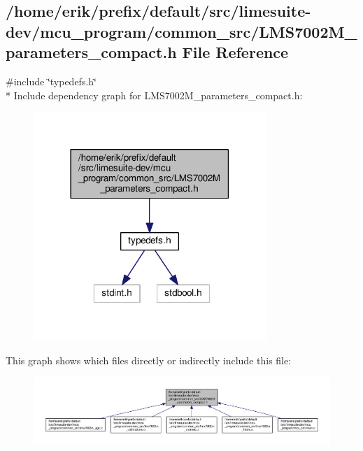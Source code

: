 \subsection{/home/erik/prefix/default/src/limesuite-\/dev/mcu\+\_\+program/common\+\_\+src/\+L\+M\+S7002\+M\+\_\+parameters\+\_\+compact.h File Reference}
\label{LMS7002M__parameters__compact_8h}
{\ttfamily \#include \char`\"{}typedefs.\+h\char`\"{}}\\*
Include dependency graph for L\+M\+S7002\+M\+\_\+parameters\+\_\+compact.\+h\+:
\nopagebreak
\begin{figure}[H]
\begin{center}
\leavevmode
\includegraphics[width=249pt]{d5/d2d/LMS7002M__parameters__compact_8h__incl}
\end{center}
\end{figure}
This graph shows which files directly or indirectly include this file\+:
\nopagebreak
\begin{figure}[H]
\begin{center}
\leavevmode
\includegraphics[width=350pt]{dc/d04/LMS7002M__parameters__compact_8h__dep__incl}
\end{center}
\end{figure}
